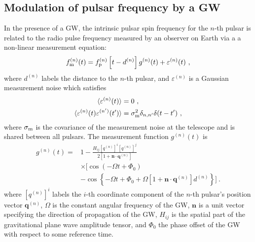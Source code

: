 \documentclass[fleqn,usenatbib,useAMS]{mnras}
\begin{document}
\subsection{Modulation of pulsar frequency by a GW} \label{sec:psr_measured}
In the presence of a GW, the intrinsic pulsar spin frequency for the $n$-th pulsar is related to the radio pulse frequency measured by an observer on Earth via a a non-linear measurement equation:
\begin{equation}
	f_{\rm m}^{(n)}(t) = f_{\rm p}^{(n)}\left [t-d^{(n)} \right ] g^{(n)}(t) +  \varepsilon^{(n)}(t)\ ,
	\label{eq:measurement}
\end{equation}
where $d^{(n)}$ labels the distance to the $n$-th pulsar, and $\varepsilon^{(n)}$ is a Gaussian measurement noise which satisfies 
\begin{align}
	\langle \varepsilon^{(n)}(t) \rangle &= 0 \ , \\
	\langle \varepsilon^{(n)}(t) \varepsilon^{(n')}(t') \rangle &= \sigma_{\rm m}^2 \delta_{n,n'} \delta(t - t') \ ,	\label{eq:vareps}
\end{align}
where $\sigma_{\rm m}$ is the covariance of the measurement noise at the telescope and is shared between all pulsars. The measurement function $g^{(n)}(t)$ is
\begin{align}
	g^{(n)}(t) =& 1 - \frac{ H_{ij}[q^{(n)}]^i [q^{(n)}]^j }{2 [1 + \boldsymbol{n}\cdot \boldsymbol{q}^{(n)}] } \nonumber \\
	& \times \Big[\cos\left(-\Omega t +\Phi_0\right) \nonumber \\
	&- \cos \left \{-\Omega t +\Phi_0 + \Omega \left[1 + \boldsymbol{n}\cdot \boldsymbol{q}^{(n)} \right]  d^{(n)} \right \} \Big ] \ .
	\label{eq:g_func_trig}
\end{align}
where $[q^{(n)}]^i$ labels the $i$-th coordinate component of the $n$-th pulsar's position vector $\boldsymbol{q}^{(n)}$, $\Omega$ is the constant angular frequency of the GW, $\boldsymbol{n}$ is a unit vector specifying the direction of propagation of the GW, $H_{ij}$ is the spatial part of the gravitational plane wave amplitude tensor, and $\Phi_0$ the phase offset of the GW with respect to some reference time. \newline  
\end{document}
